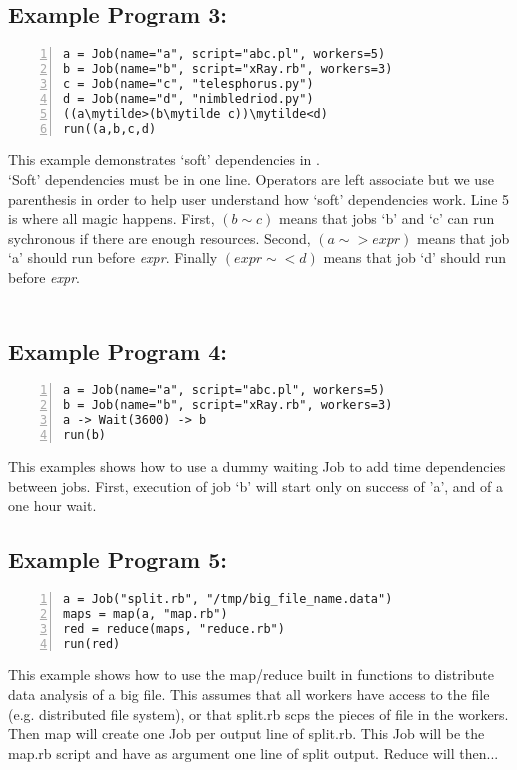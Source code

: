 \subsection*{Example Program 3:}
\begin{Verbatim}[numbers=left,commandchars=\\\{\}]
a = Job(name="a", script="abc.pl", workers=5)
b = Job(name="b", script="xRay.rb", workers=3)
c = Job(name="c", "telesphorus.py")
d = Job(name="d", "nimbledriod.py")
((a\mytilde>(b\mytilde c))\mytilde<d)
run((a,b,c,d)
\end{Verbatim}

This example demonstrates `soft' dependencies in \lang{}.\\
`Soft' dependencies must be in one line. Operators
are left associate but we use parenthesis in order to help
user understand how `soft' dependencies work. Line 5 is where all
magic happens. First, $(b\sim c)$ means that jobs `b' and `c' can run 
sychronous if there are enough resources. Second,
$(a\sim>expr)$ means that job `a' should run before \textit{expr}. 
Finally $(expr\sim<d)$ means that job `d' should run before \textit{expr}.\\
\\

\subsection*{Example Program 4:}
\begin{Verbatim}[numbers=left,commandchars=\\\{\}]
a = Job(name="a", script="abc.pl", workers=5)
b = Job(name="b", script="xRay.rb", workers=3)
a -> Wait(3600) -> b
run(b)
\end{Verbatim}

This examples shows how to use a dummy waiting Job to add time dependencies
between jobs. First, execution of job `b' will start only on success of 'a',
and of a one hour wait.

\subsection*{Example Program 5:}
\begin{Verbatim}[numbers=left,commandchars=\\\{\}]
a = Job("split.rb", "/tmp/big_file_name.data")
maps = map(a, "map.rb")
red = reduce(maps, "reduce.rb")
run(red)
\end{Verbatim}

This example shows how to use the map/reduce built in functions to distribute data
analysis of a big file. This assumes that all workers have access to the file (e.g.
distributed file system), or that split.rb scps the pieces of file in the workers.
Then map will create one Job per output line of split.rb. This Job will be the map.rb
script and have as argument one line of split output. Reduce will then...
